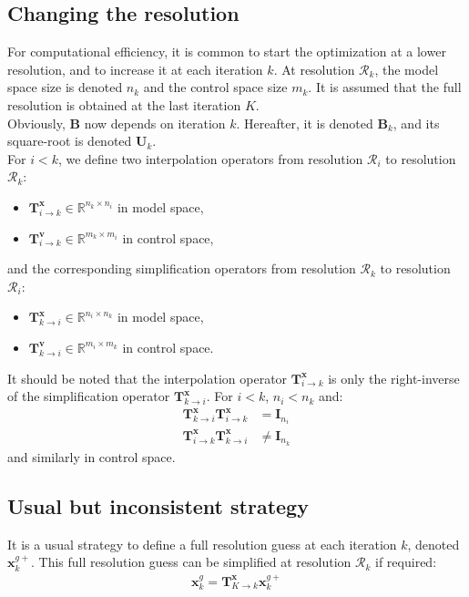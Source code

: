 \documentclass[12pt]{scrartcl}
\begin{document}
\subsection{Changing the resolution}
For computational efficiency, it is common to start the optimization at a lower resolution, and to increase it at each iteration $k$. At resolution $\mathcal{R}_k$, the model space size is denoted $n_k$ and the control space size $m_k$. It is assumed that the full resolution is obtained at the last iteration $K$.\\

Obviously, $\mathbf{B}$ now depends on iteration $k$. Hereafter, it is denoted $\mathbf{B}_k$, and its square-root is denoted $\mathbf{U}_k$.\\

For $i < k$, we define two interpolation operators from resolution $\mathcal{R}_i$ to resolution $\mathcal{R}_k$:
\begin{itemize}
\item $\mathbf{T}^\mathbf{x}_{i \rightarrow k} \in \mathbb{R}^{n_k \times n_i}$ in model space,
\item $\mathbf{T}^\mathbf{v}_{i \rightarrow k} \in \mathbb{R}^{m_k \times m_i}$ in control space,
\end{itemize}
and the corresponding simplification operators from resolution $\mathcal{R}_k$ to resolution $\mathcal{R}_i$:
\begin{itemize}
\item $\mathbf{T}^\mathbf{x}_{k \rightarrow i} \in \mathbb{R}^{n_i \times n_k}$ in model space,
\item $\mathbf{T}^\mathbf{v}_{k \rightarrow i} \in \mathbb{R}^{m_i \times m_k}$ in control space.
\end{itemize}

It should be noted that the interpolation operator $\mathbf{T}^\mathbf{x}_{i \rightarrow k}$ is only the right-inverse of the simplification operator $\mathbf{T}^\mathbf{x}_{k \rightarrow i}$. For $i < k$, $n_i < n_k$ and:
\begin{align}
\mathbf{T}^\mathbf{x}_{k \rightarrow i} \mathbf{T}^\mathbf{x}_{i \rightarrow k} & = \mathbf{I}_{n_i} \\
\mathbf{T}^\mathbf{x}_{i \rightarrow k} \mathbf{T}^\mathbf{x}_{k \rightarrow i} & \ne \mathbf{I}_{n_k}
\end{align}
and similarly in control space.

\subsection{Usual but inconsistent strategy}
It is a usual strategy to define a full resolution guess at each iteration $k$, denoted $\mathbf{x}^{g+}_k$. This full resolution guess can be simplified at resolution $\mathcal{R}_k$ if required:
\begin{align}
\mathbf{x}^g_k = \mathbf{T}^\mathbf{x}_{K \rightarrow k} \mathbf{x}^{g+}_k 
\end{align}
\end{document}
